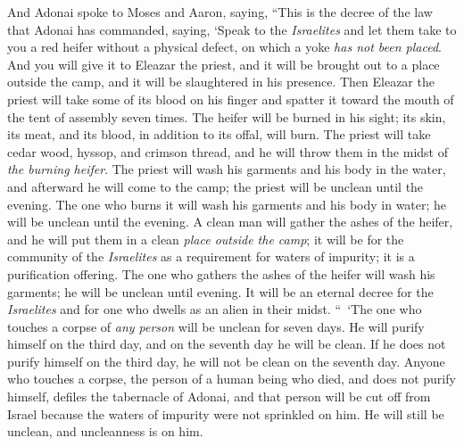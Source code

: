 \begin{biblechapter} %
 And Adonai spoke to Moses and Aaron, saying,
\verse “This is the decree of the law that Adonai has commanded, saying, ‘Speak to the \textit{Israelites} and let them take to you a red heifer without a physical defect, on which a yoke \textit{has not been placed}.
\verse And you will give it to Eleazar the priest, and it will be brought out to a place outside the camp, and it will be slaughtered in his presence.
\verse Then Eleazar the priest will take some of its blood on his finger and spatter it toward the mouth of the tent of assembly seven times.
\verse The heifer will be burned in his sight; its skin, its meat, and its blood, in addition to its offal, will burn.
\verse The priest will take cedar wood, hyssop, and crimson thread, and he will throw them in the midst of \textit{the burning heifer}.
\verse The priest will wash his garments and his body in the water, and afterward he will come to the camp; the priest will be unclean until the evening.
\verse The one who burns it will wash his garments and his body in water; he will be unclean until the evening.
\verse A clean man will gather the ashes of the heifer, and he will put them in a clean \textit{place outside the camp}; it will be for the community of the \textit{Israelites} as a requirement for waters of impurity; it is a purification offering.
\verse The one who gathers the ashes of the heifer will wash his garments; he will be unclean until evening. It will be an eternal decree for the \textit{Israelites} and for one who dwells as an alien in their midst.
\verse “ ‘The one who touches a corpse of \textit{any person} will be unclean for seven days.
\verse He will purify himself on the third day, and on the seventh day he will be clean. If he does not purify himself on the third day, he will not be clean on the seventh day.
\verse Anyone who touches a corpse, the person of a human being who died, and does not purify himself, defiles the tabernacle of Adonai, and that person will be cut off from Israel because the waters of impurity were not sprinkled on him. He will still be unclean, and uncleanness is on him.

\end{biblechapter}
